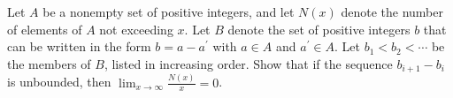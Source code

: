 Let $A$ be a nonempty set of positive integers, and let $N(x)$ denote the number of elements of $A$ not exceeding $x$. Let $B$ denote the set of positive integers $b$ that can be written in the form $b=a-a^{\prime}$ with $a\in A$ and $a^{\prime}\in A$. Let $b_1<b_2<\cdots$ be the members of $B$, listed in increasing order. Show that if the sequence $b_{i+1}-b_i$ is unbounded, then $\lim_{x\to \infty}\frac{N(x)}{x}=0$.